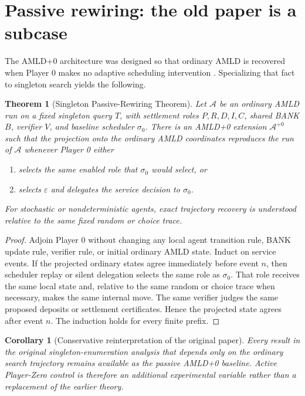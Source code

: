 \documentclass[11pt]{article}
\newtheorem{theorem}[definition]{Theorem}
\newtheorem{corollary}[definition]{Corollary}
\begin{document}
\section{Passive rewiring: the old paper is a subcase}

The AMLD+0 architecture was designed so that ordinary AMLD is recovered when
Player 0 makes no adaptive scheduling intervention
\cite{tenneson-amldplus0}.  Specializing that fact to singleton search yields
the following.

\begin{theorem}[Singleton Passive-Rewiring Theorem]
Let $\mathcal A$ be an ordinary AMLD run on a fixed singleton query $T$, with
settlement roles $P,R,D,I,C$, shared BANK $B$, verifier $V$, and baseline
scheduler $\sigma_0$.  There is an AMLD+0 extension $\mathcal A^{+0}$ such
that the projection onto the ordinary AMLD coordinates reproduces the run of
$\mathcal A$ whenever Player 0 either
\begin{enumerate}
    \item selects the same enabled role that $\sigma_0$ would select, or
    \item selects $\varepsilon$ and delegates the service decision to
    $\sigma_0$.
\end{enumerate}
For stochastic or nondeterministic agents, exact trajectory recovery is
understood relative to the same fixed random or choice trace.
\end{theorem}

\begin{proof}
Adjoin Player 0 without changing any local agent transition rule, BANK update
rule, verifier rule, or initial ordinary AMLD state.  Induct on service events.
If the projected ordinary states agree immediately before event $n$, then
scheduler replay or silent delegation selects the same role as $\sigma_0$.
That role receives the same local state and, relative to the same random or
choice trace when necessary, makes the same internal move.  The same verifier
judges the same proposed deposits or settlement certificates.  Hence the
projected state agrees after event $n$.  The induction holds for every finite
prefix.
\end{proof}

\begin{corollary}[Conservative reinterpretation of the original paper]
Every result in the original singleton-enumeration analysis that depends only
on the ordinary search trajectory remains available as the passive AMLD+0
baseline.  Active Player-Zero control is therefore an additional experimental
variable rather than a replacement of the earlier theory.
\end{corollary}
\end{document}
